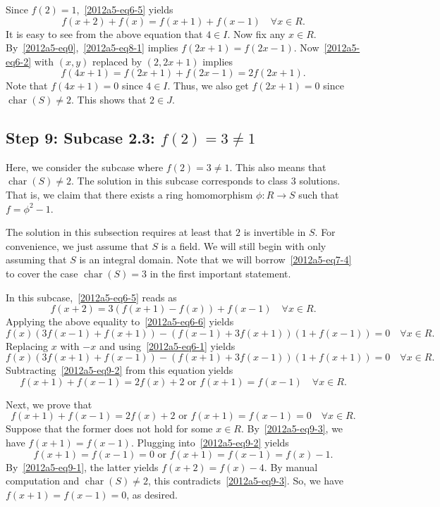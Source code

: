 \documentclass{article}
\DeclareMathOperator{\rchar}{char}
\begin{document}
Since $f(2) = 1$,~\eqref{2012a5-eq6-5} yields
\[ f(x + 2) + f(x) = f(x + 1) + f(x - 1) \quad \forall x \in R. \tag{8.1}\label{2012a5-eq8-1} \]
It is easy to see from the above equation that $4 \in I$.
Now fix any $x \in R$.
By~\eqref{2012a5-eq0},~\eqref{2012a5-eq8-1} implies $f(2x + 1) = f(2x - 1)$.
Now~\eqref{2012a5-eq6-2} with $(x, y)$ replaced by $(2, 2x + 1)$ implies
\[ f(4x + 1) = f(2x + 1) + f(2x - 1) = 2 f(2x + 1). \]
Note that $f(4x + 1) = 0$ since $4 \in I$.
Thus, we also get $f(2x + 1) = 0$ since $\rchar(S) \neq 2$.
This shows that $2 \in J$.









\subsection*{Step 9: Subcase 2.3: $f(2) = 3 \neq 1$}

Here, we consider the subcase where $f(2) = 3 \neq 1$.
This also means that $\rchar(S) \neq 2$.
The solution in this subcase corresponds to class 3 solutions.
That is, we claim that there exists a ring homomorphism $\phi : R \to S$ such that $f = \phi^2 - 1$.

The solution in this subsection requires at least that $2$ is invertible in $S$.
For convenience, we just assume that $S$ is a field.
We will still begin with only assuming that $S$ is an integral domain.
Note that we will borrow~\eqref{2012a5-eq7-4} to cover the case $\rchar(S) = 3$ in the first important statement.

In this subcase,~\eqref{2012a5-eq6-5} reads as
\[ f(x + 2) = 3 (f(x + 1) - f(x)) + f(x - 1) \quad \forall x \in R. \tag{9.1}\label{2012a5-eq9-1} \]
Applying the above equality to~\eqref{2012a5-eq6-6} yields
\[ f(x) (3 f(x - 1) + f(x + 1)) - (f(x - 1) + 3 f(x + 1)) (1 + f (x - 1)) = 0 \quad \forall x \in R. \tag{9.2}\label{2012a5-eq9-2} \]
Replacing $x$ with $-x$ and using~\eqref{2012a5-eq6-1} yields
\[ f(x) (3 f(x + 1) + f(x - 1)) - (f(x + 1) + 3 f(x - 1)) (1 + f (x + 1)) = 0 \quad \forall x \in R. \]
Subtracting~\eqref{2012a5-eq9-2} from this equation yields
\[ f(x + 1) + f(x - 1) = 2 f(x) + 2 \text{ or } f(x + 1) = f(x - 1) \quad \forall x \in R. \tag{9.3}\label{2012a5-eq9-3} \]

Next, we prove that
\[ f(x + 1) + f(x - 1) = 2 f(x) + 2 \text{ or } f(x + 1) = f(x - 1) = 0 \quad \forall x \in R. \tag{9.4}\label{2012a5-eq9-4} \]
Suppose that the former does not hold for some $x \in R$.
By~\eqref{2012a5-eq9-3}, we have $f(x + 1) = f(x - 1)$.
Plugging into~\eqref{2012a5-eq9-2} yields
\[ f(x + 1) = f(x - 1) = 0 \text{ or } f(x + 1) = f(x - 1) = f(x) - 1. \]
By~\eqref{2012a5-eq9-1}, the latter yields $f(x + 2) = f(x) - 4$.
By manual computation and $\rchar(S) \neq 2$, this contradicts~\eqref{2012a5-eq9-3}.
So, we have $f(x + 1) = f(x - 1) = 0$, as desired.
\end{document}
